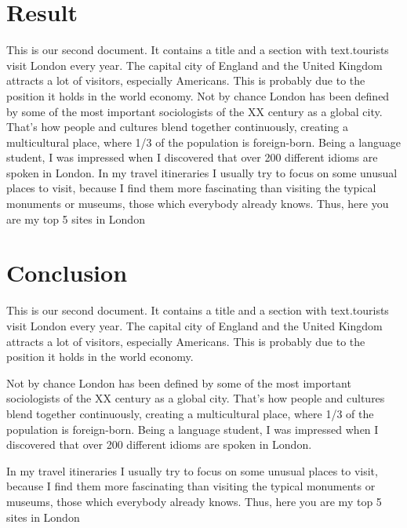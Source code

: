 \documentclass[a4paper,twoside]{report}
\begin{document}
\section{Result}
This is our second document. It contains a title and a 
section with text.tourists visit London every year. The capital city of England and the United Kingdom attracts a lot of visitors, especially Americans. This is probably due to the position it holds in the world economy.
Not by chance London has been defined by some of the most important sociologists of the XX century as a global city. That’s how people and cultures blend together continuously, creating a multicultural place, where 1/3 of the population is foreign-born. Being a language student, I was impressed when I discovered that over 200 different idioms are spoken in London.
In my travel itineraries I usually try to focus on some unusual places to visit, because I find them more fascinating than visiting the typical monuments or museums, those which everybody already knows. Thus, here you are my top 5 sites in London
\newpage
\section{Conclusion}
This is our second document. It contains a title and a 
section with text.tourists visit London every year. The capital city of England and the United Kingdom attracts a lot of visitors, especially Americans. This is probably due to the position it holds in the world economy.\par
Not by chance London has been defined by some of the most important sociologists of the XX century as a global city. That’s how people and cultures blend together continuously, creating a multicultural place, where 1/3 of the population is foreign-born. Being a language student, I was impressed when I discovered that over 200 different idioms are spoken in London.\par
In my travel itineraries I usually try to focus on some unusual places to visit, because I find them more fascinating than visiting the typical monuments or museums, those which everybody already knows. Thus, here you are my top 5 sites in London
\newpage
\end{document}
